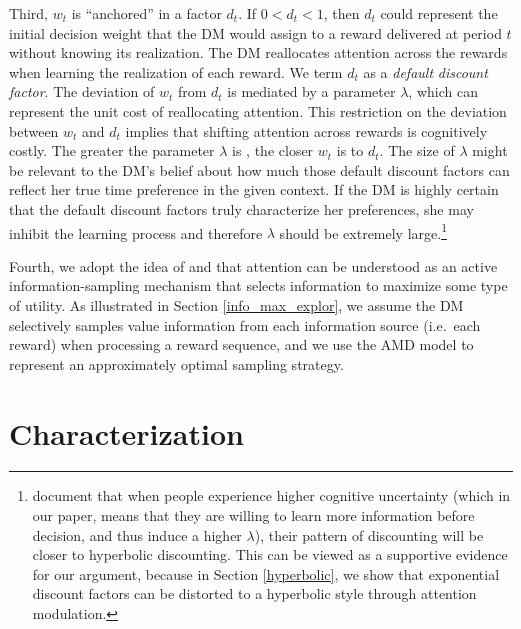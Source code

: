\documentclass[
  12pt,
]{article}
\begin{document}
Third, \(w_t\) is ``anchored'' in a factor \(d_t\). If \(0<d_t<1\), then
\(d_t\) could represent the initial decision weight that the DM would
assign to a reward delivered at period \(t\) without knowing its
realization. The DM reallocates attention across the rewards when
learning the realization of each reward. We term \(d_t\) as a
\emph{default} \emph{discount factor}. The deviation of \(w_t\) from
\(d_t\) is mediated by a parameter \(\lambda\), which can represent the
unit cost of reallocating attention. This restriction on the deviation
between \(w_t\) and \(d_t\) implies that shifting attention across
rewards is cognitively costly. The greater the parameter \(\lambda\) is
, the closer \(w_t\) is to \(d_t\). The size of \(\lambda\) might be
relevant to the DM's belief about how much those default discount
factors can reflect her true time preference in the given context. If
the DM is highly certain that the default discount factors truly
characterize her preferences, she may inhibit the learning process and
therefore \(\lambda\) should be extremely large.\footnote{\citet{enke2023complexity}
  document that when people experience higher cognitive uncertainty
  (which in our paper, means that they are willing to learn more
  information before decision, and thus induce a higher \(\lambda\)),
  their pattern of discounting will be closer to hyperbolic discounting.
  This can be viewed as a supportive evidence for our argument, because
  in Section \ref{hyperbolic}, we show that exponential discount factors
  can be distorted to a hyperbolic style through attention modulation.}

Fourth, we adopt the idea of \citet{gottlieb2012attention} and
\citet{gottlieb2013information} that attention can be understood as an
active information-sampling mechanism that selects information to
maximize some type of utility. As illustrated in Section
\ref{info_max_explor}, we assume the DM selectively samples value
information from each information source (i.e.~each reward) when
processing a reward sequence, and we use the AMD model to represent an
approximately optimal sampling strategy.

\hypertarget{characterization}{%
\section{\texorpdfstring{Characterization
\label{interpretation}}{Characterization }}\label{characterization}}
\end{document}
